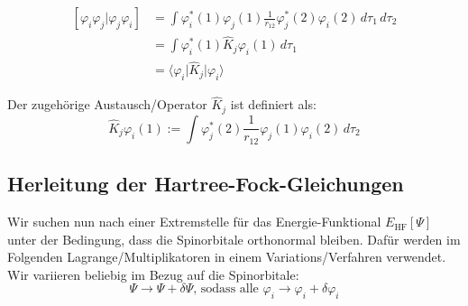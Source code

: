 \begin{equation}\label{exchange}
  \begin{aligned}
  \left[ \varphi_i \varphi_j \vert \varphi_j \varphi_i \right] &= 
  \int \varphi_i^*(1) \varphi_j(1) \frac{1}{r_{12}} \varphi_j^*(2) \varphi_i(2) \,d\tau_1 \,d\tau_2\\
  &= \int \varphi_i^*(1) \hat{K}_j \varphi_i(1) \,d\tau_1 \\ 
  &= \langle \varphi_i \vert \hat{K}_j \vert \varphi_i \rangle
\end{aligned}
\end{equation}

Der zugehörige Austausch\-/Operator $\hat{K}_j$ ist definiert als:
\begin{equation}\label{exchange-operator}
  \hat{K}_j \varphi_i(1) :=
  \int \varphi_j^*(2) \frac{1}{r_{12}} \varphi_j(1) \varphi_i(2) \,d\tau_2
\end{equation}

\cite[S. 206]{lewars_2016} \cite[S. 23]{tc2_3}

\subsection{Herleitung der Hartree-Fock-Gleichungen}
Wir suchen nun nach einer Extremstelle für das Energie-Funktional $E_\textrm{HF}[\Psi]$ unter der Bedingung, 
dass die Spinorbitale orthonormal bleiben. 
Dafür werden im Folgenden Lagrange\-/Multiplikatoren in einem Variations\-/Verfahren verwendet.
Wir variieren beliebig im Bezug auf die Spinorbitale: 
\begin{equation}
\Psi \rightarrow \Psi + \delta \Psi
\text{, sodass alle } \varphi_i \rightarrow \varphi_i + \delta \varphi_i
\end{equation}

